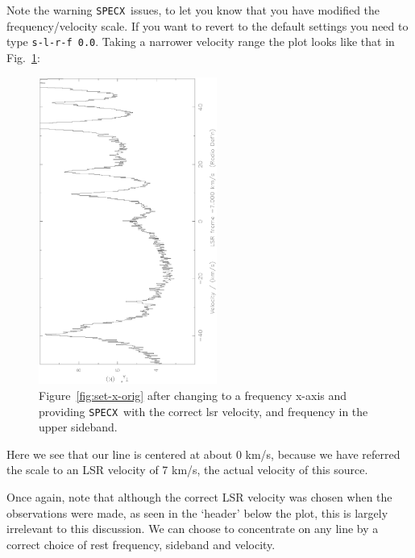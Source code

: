 \documentclass[11pt,twoside]{article}
\newcommand{\SPECX}{{\tt SPECX}}
\begin{document}
Note the warning \SPECX\ issues, to let you know that you have
modified the frequency/velocity scale. If you want to revert to the
default settings you need to type \verb|s-l-r-f 0.0|. Taking a
narrower velocity range the plot looks like that in Fig.~\ref{fig:set-to-usb}:

\begin{figure}[ht]
\begin{minipage}[t]{\textwidth}
\begin{minipage}[b]{0.5\textwidth}
\centering
\includegraphics[angle=-90,width=2.3in]{sc8_hdo-usb.ps}
\end{minipage}
\hfill
\begin{minipage}[b]{0.45\textwidth}
\caption[Part of the same in the USB]
{\small{Figure~\ref{fig:set-x-orig} after changing to a frequency
x-axis and providing \SPECX\ with the correct lsr velocity, and
frequency in the upper sideband.
\vspace*{1cm}
}}
\label{fig:set-to-usb}
\end{minipage}
\end{minipage}
\end{figure}

Here we see that our line is centered at about 0 km/s, because we have
referred the scale to an LSR velocity of 7 km/s, the actual velocity of
this source.

Once again, note that although the correct LSR velocity was chosen
when the observations were made, as seen in the `header' below the
plot, this is largely irrelevant to this discussion. We can choose to
concentrate on any line by a correct choice of rest frequency,
sideband and velocity.
\end{document}
